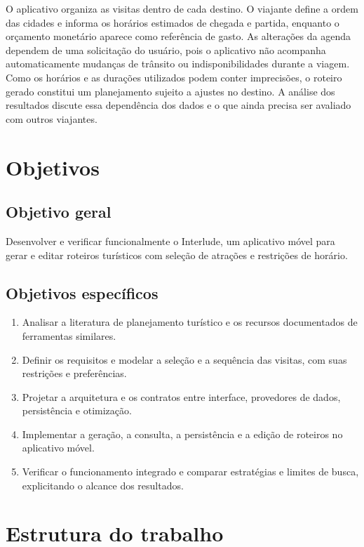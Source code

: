 O aplicativo organiza as visitas dentro de cada destino. O viajante define a ordem das cidades e informa os horários estimados de chegada e partida, enquanto o orçamento monetário aparece como referência de gasto. As alterações da agenda dependem de uma solicitação do usuário, pois o aplicativo não acompanha automaticamente mudanças de trânsito ou indisponibilidades durante a viagem. Como os horários e as durações utilizados podem conter imprecisões, o roteiro gerado constitui um planejamento sujeito a ajustes no destino. A análise dos resultados discute essa dependência dos dados e o que ainda precisa ser avaliado com outros viajantes.

\section{Objetivos}

\subsection{Objetivo geral}

Desenvolver e verificar funcionalmente o Interlude, um aplicativo móvel para gerar e editar roteiros turísticos com seleção de atrações e restrições de horário.

\subsection{Objetivos específicos}

\begin{enumerate}
  \item Analisar a literatura de planejamento turístico e os recursos documentados de ferramentas similares.
  \item Definir os requisitos e modelar a seleção e a sequência das visitas, com suas restrições e preferências.
  \item Projetar a arquitetura e os contratos entre interface, provedores de dados, persistência e otimização.
  \item Implementar a geração, a consulta, a persistência e a edição de roteiros no aplicativo móvel.
  \item Verificar o funcionamento integrado e comparar estratégias e limites de busca, explicitando o alcance dos resultados.
\end{enumerate}

\section{Estrutura do trabalho}

